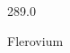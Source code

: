\documentclass[12pt]{article}
\begin{document}
\hfill{}
\vfill
\begin{center}
  {\fontsize{50}{60}
  }

  \vspace{1em}

  289.0

Flerovium
\end{center}
\vfill
\end{document}
